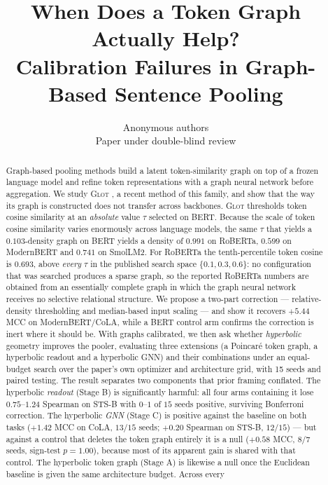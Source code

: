 \documentclass{article} %
\title{When Does a Token Graph Actually Help?\\
Calibration Failures in Graph-Based Sentence Pooling}
\author{Anonymous authors\\
Paper under double-blind review}
\begin{document}
\maketitle

\begin{abstract}
Graph-based pooling methods build a latent token-similarity graph on top of a
frozen language model and refine token representations with a graph neural
network before aggregation. We study \textsc{Glot}
\citep{mantri2026glot}, a recent method of this family, and show that the way
its graph is constructed does not transfer across backbones. \textsc{Glot}
thresholds token cosine similarity at an \emph{absolute} value $\tau$ selected
on BERT. Because the scale of token cosine similarity varies enormously across
language models, the same $\tau$ that yields a $0.103$-density graph on BERT
yields a density of $0.991$ on RoBERTa, $0.599$ on ModernBERT and $0.741$ on
SmolLM2. For RoBERTa the tenth-percentile token cosine is $0.693$, above
\emph{every} $\tau$ in the published search space $\{0.1, 0.3, 0.6\}$: no
configuration that was searched produces a sparse graph, so the reported
RoBERTa numbers are obtained from an essentially complete graph in which the
graph neural network receives no selective relational structure. We propose a
two-part correction --- relative-density thresholding and median-based input
scaling --- and show it recovers $+5.44$ MCC on ModernBERT/CoLA, while a BERT
control arm confirms the correction is inert where it should be. With graphs
calibrated, we then ask whether \emph{hyperbolic} geometry improves the pooler,
evaluating three extensions (a Poincar\'e token graph, a hyperbolic readout and
a hyperbolic GNN) and their combinations under an equal-budget search over the
paper's own optimizer and architecture grid, with 15 seeds and paired testing.
The result separates two components that prior framing conflated. The
hyperbolic \emph{readout} (Stage B) is significantly harmful: all four arms
containing it lose $0.75$--$1.24$ Spearman on STS-B with $0$--$1$ of $15$ seeds
positive, surviving Bonferroni correction. The hyperbolic \emph{GNN} (Stage C)
is positive against the baseline on both tasks ($+1.42$ MCC on CoLA, $13/15$
seeds; $+0.20$ Spearman on STS-B, $12/15$) --- but against a control that
deletes the token graph entirely it is a null ($+0.58$ MCC, $8/7$ seeds,
sign-test $p = 1.00$), because most of its apparent gain is shared with that
control. The hyperbolic token graph (Stage A) is likewise a null once the
Euclidean baseline is given the same architecture budget. Across every

\end{abstract}
\end{document}
